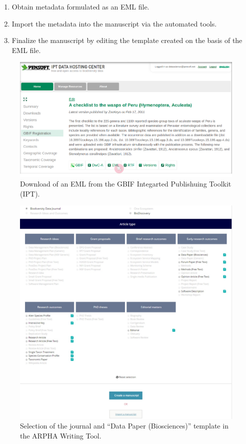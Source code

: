 \begin{enumerate}
    \item Obtain metadata formulated as an EML file.
    \item Import the metadata into the manuscript via the automated tools.
    \item Finalize the manuscript by editing the template created on the basis of the EML file.
\end{enumerate}

\begin{figure}
\centering
\includegraphics[width=\textwidth]{Figures/EML-download}
\decoRule
\caption{Download of an EML from the GBIF Integarted Publishuing Toolkit (IPT).}
\label{fig:EML-download}
\end{figure}

\begin{figure}
\centering
\includegraphics[width=\textwidth]{Figures/journal-selection}
\decoRule
\caption{Selection of the journal and ``Data Paper (Biosciences)'' template in the ARPHA Writing Tool.}
\label{fig:journal-selection}
\end{figure}

